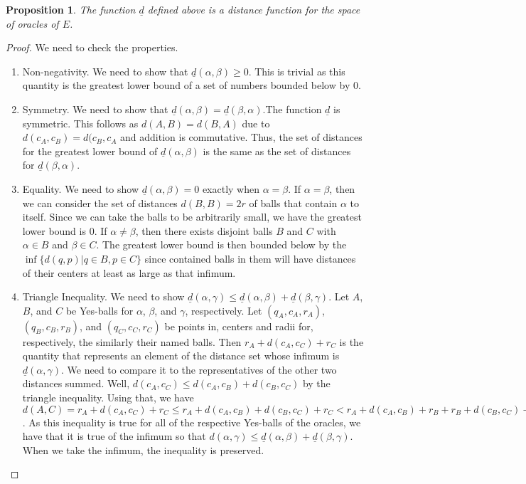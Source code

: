 \documentclass[12pt]{article}
\newtheorem{proposition}{Proposition}[section]
\begin{document}
\begin{proposition}
    The function $\underline{d}$ defined above is a distance function for the space of oracles of $E$. 
\end{proposition}

\begin{proof}
We need to check the properties. 
\begin{enumerate}
\item Non-negativity. We need to show that $\underline{d}(\alpha, \beta) \geq 0$. This is trivial as this quantity is the greatest lower bound of a set of numbers bounded below by 0. 
\item Symmetry. We need to show that $\underline{d}(\alpha,\beta) = \underline{d}(\beta,\alpha)$.The function $\underline{d}$ is symmetric. This follows as $d(A,B) = d(B,A)$ due to $d(c_A, c_B) = d(c_B, c_A$ and addition is commutative. Thus, the set of distances for the greatest lower bound of $\underline{d}(\alpha,\beta)$ is the same as the set of distances for $\underline{d}(\beta,\alpha)$.
\item Equality. We need to show $\underline{d}(\alpha,\beta) = 0$ exactly when $\alpha=\beta$. If $\alpha=\beta$, then we can consider the set of distances $d(B,B)= 2r$ of balls that contain $\alpha$ to itself. Since we can take the balls to be arbitrarily small, we have the greatest lower bound is 0. If $\alpha \neq \beta$, then there exists disjoint balls $B$ and $C$ with $\alpha \in B$ and $\beta \in C$. The greatest lower bound is then bounded below by the $\inf\{d(q,p) | q \in B, p \in C\}$ since contained balls in them will have distances of their centers at least as large as that infimum. 
\item Triangle Inequality. We need to show $\underline{d}(\alpha,\gamma) \leq \underline{d}(\alpha,\beta) + \underline{d}(\beta,\gamma)$. Let $A$, $B$, and $C$ be Yes-balls for $\alpha$, $\beta$, and $\gamma$, respectively. Let $(q_A,c_A, r_A)$, $(q_B,c_B, r_B)$, and $(q_C,c_C, r_C)$ be points in, centers and radii for, respectively, the similarly their named balls. Then $r_A + d(c_A, c_C) + r_C$ is the quantity that represents an element of the distance set whose infimum is $\underline{d}(\alpha,\gamma)$. We need to compare it to the representatives of the other two distances summed. Well, $d(c_A,c_C) \leq d(c_A,c_B) + d(c_B, c_C)$ by the triangle inequality. Using that, we have  $d(A, C) = r_A + d(c_A, c_C) + r_C \leq r_A +  d(c_A,c_B) + d(c_B, c_C) + r_C <  r_A +  d(c_A,c_B) + r_B + r_B + d(c_B, c_C) + r_ C = d(A,B) + d(B, C)$. As this inequality is true for all of the respective Yes-balls of the oracles, we have that it is true of the infimum so that $d(\alpha, \gamma) \leq \underline{d}(\alpha,\beta) + \underline{d}(\beta,\gamma)$. When we take the infimum, the inequality is preserved. 
\end{enumerate}
\end{proof}
\end{document}
